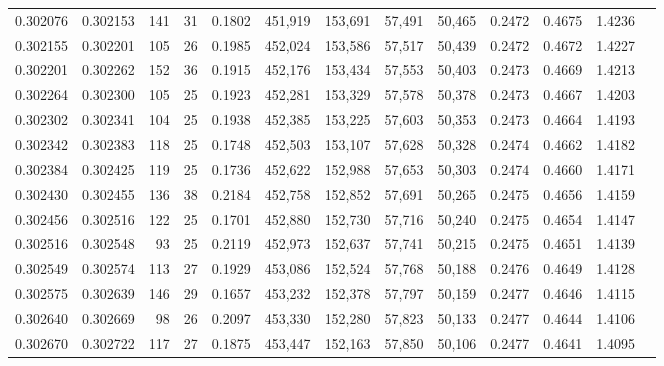 \begin{tabular}{rrrrrrrrrrrrr}
0.302076 & 0.302153 &   141 &  31 &                                     0.1802 & 451,919 & 153,691 &  57,491 &  50,465 & 0.2472 & 0.4675 & 1.4236 \\
0.302155 & 0.302201 &   105 &  26 &                                     0.1985 & 452,024 & 153,586 &  57,517 &  50,439 & 0.2472 & 0.4672 & 1.4227 \\
0.302201 & 0.302262 &   152 &  36 &                                     0.1915 & 452,176 & 153,434 &  57,553 &  50,403 & 0.2473 & 0.4669 & 1.4213 \\
0.302264 & 0.302300 &   105 &  25 &                                     0.1923 & 452,281 & 153,329 &  57,578 &  50,378 & 0.2473 & 0.4667 & 1.4203 \\
0.302302 & 0.302341 &   104 &  25 &                                     0.1938 & 452,385 & 153,225 &  57,603 &  50,353 & 0.2473 & 0.4664 & 1.4193 \\
0.302342 & 0.302383 &   118 &  25 &                                     0.1748 & 452,503 & 153,107 &  57,628 &  50,328 & 0.2474 & 0.4662 & 1.4182 \\
0.302384 & 0.302425 &   119 &  25 &                                     0.1736 & 452,622 & 152,988 &  57,653 &  50,303 & 0.2474 & 0.4660 & 1.4171 \\
0.302430 & 0.302455 &   136 &  38 &                                     0.2184 & 452,758 & 152,852 &  57,691 &  50,265 & 0.2475 & 0.4656 & 1.4159 \\
0.302456 & 0.302516 &   122 &  25 &                                     0.1701 & 452,880 & 152,730 &  57,716 &  50,240 & 0.2475 & 0.4654 & 1.4147 \\
0.302516 & 0.302548 &    93 &  25 &                                     0.2119 & 452,973 & 152,637 &  57,741 &  50,215 & 0.2475 & 0.4651 & 1.4139 \\
0.302549 & 0.302574 &   113 &  27 &                                     0.1929 & 453,086 & 152,524 &  57,768 &  50,188 & 0.2476 & 0.4649 & 1.4128 \\
0.302575 & 0.302639 &   146 &  29 &                                     0.1657 & 453,232 & 152,378 &  57,797 &  50,159 & 0.2477 & 0.4646 & 1.4115 \\
0.302640 & 0.302669 &    98 &  26 &                                     0.2097 & 453,330 & 152,280 &  57,823 &  50,133 & 0.2477 & 0.4644 & 1.4106 \\
0.302670 & 0.302722 &   117 &  27 &                                     0.1875 & 453,447 & 152,163 &  57,850 &  50,106 & 0.2477 & 0.4641 & 1.4095 \\

\end{tabular}
